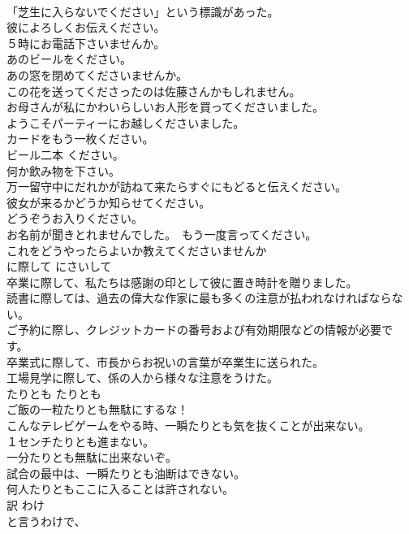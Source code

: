 \documentclass[8pt]{extreport}
\begin{document}
\begin{CJK}{UTF8}{min}
\\	「芝生に入らないでください」という標識があった。  
\\	彼によろしくお伝えください。  
\\	５時にお電話下さいませんか。  
\\	あのビールをください。  
\\	あの窓を閉めてくださいませんか。  
\\	この花を送ってくださったのは佐藤さんかもしれません。  
\\	お母さんが私にかわいらしいお人形を買ってくださいました。  
\\	ようこそパーティーにお越しくださいました。  
\\	カードをもう一枚ください。   
\\	ビール二本 ください。  
\\	何か飲み物を下さい。   
\\	万一留守中にだれかが訪ねて来たらすぐにもどると伝えください。   
\\	彼女が来るかどうか知らせてください。   
\\	どうぞうお入りください。   
\\	お名前が聞きとれませんでした。　もう一度言ってください。   
\\	これをどうやったらよいか教えてくださいませんか  
\\	に際して	にさいして	
\\	卒業に際して、私たちは感謝の印として彼に置き時計を贈りました。  
\\	読書に際しては、過去の偉大な作家に最も多くの注意が払われなければならない。   
\\	ご予約に際し、クレジットカードの番号および有効期限などの情報が必要です。  
\\	卒業式に際して、市長からお祝いの言葉が卒業生に送られた。   
\\	工場見学に際して、係の人から様々な注意をうけた。  
\\	たりとも	たりとも	
\\	ご飯の一粒たりとも無駄にするな！  
\\	こんなテレビゲームをやる時、一瞬たりとも気を抜くことが出来ない。  
\\	１センチたりとも進まない。  
\\	一分たりとも無駄に出来ないぞ。  
\\	試合の最中は、一瞬たりとも油断はできない。  
\\	何人たりともここに入ることは許されない。  
\\	訳	わけ	
\\	と言うわけで、

\end{CJK}
\end{document}
